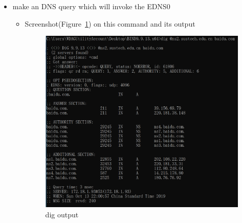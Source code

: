 \documentclass[12pt,letterpaper]{ctexart}
\begin{document}
\begin{itemize}
  \item make an DNS query which will invoke the EDNS0
  \begin{itemize}
    \item Screenshot(Figure~\ref{fig:dig}) on this command and its output
    \begin{figure}[H]
      \centering
      \includegraphics[width=0.8\linewidth]{assets/dig.png}
      \caption{dig output}
      \label{fig:dig}
    \end{figure}
  \end{itemize}


\end{itemize}
\end{document}
